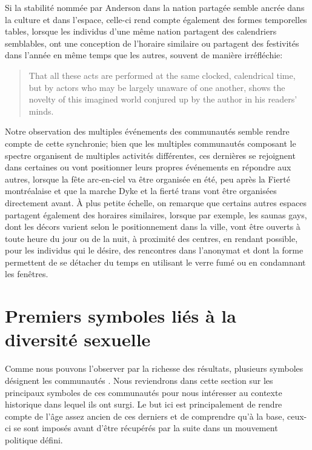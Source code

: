 Si la stabilité nommée par Anderson dans la nation partagée semble ancrée dans la culture et dans l'espace, celle-ci rend compte également des formes temporelles tables, lorsque les individus d'une même nation partagent des calendriers semblables, ont une conception de l'horaire similaire ou partagent des festivités dans l'année en même temps que les autres, souvent de manière irréfléchie:
\begin{quote}
  That all these acts are performed at the same clocked, calendrical time, but by actors who may be largely unaware of one another, shows the novelty of this imagined world conjured up by the author in his readers’ minds.
  \citep[26]{Anderson2006}
\end{quote}
Notre observation des multiples événements des communautés \lgbt semble rendre compte de cette synchronie; bien que les multiples communautés composant le spectre \lgbt organisent de multiples activités différentes, ces dernières se rejoignent dans certaines ou vont positionner leurs propres événements en répondre aux autres, lorsque la fête arc-en-ciel va être organisée en été, peu après la Fierté montréalaise et que la marche Dyke et la fierté trans vont être organisées directement avant.
À plus petite échelle, on remarque que certains autres espaces partagent également des horaires similaires, lorsque par exemple, les saunas gays, dont les décors varient selon le positionnement dans la ville, vont être ouverts à toute heure du jour ou de la nuit, à proximité des centres, en rendant possible, pour les individus qui le désire, des rencontres dans l'anonymat et dont la forme permettent de se détacher du temps en utilisant le verre fumé ou en condamnant les fenêtres.

\section{Premiers symboles liés à la diversité sexuelle}
\label{sec:premiers_symboles_li_s_la_diversit_sexuelle}

Comme nous pouvons l'observer par la richesse des résultats, plusieurs symboles désignent les communautés \lgbt{}.
Nous reviendrons dans cette section sur les principaux symboles de ces communautés pour nous intéresser au contexte historique dans lequel ils ont surgi.
Le but ici est principalement de rendre compte de l'âge assez ancien de ces derniers et de comprendre qu'à la base, ceux-ci se sont imposés avant d'être récupérés par la suite dans un mouvement politique défini.

